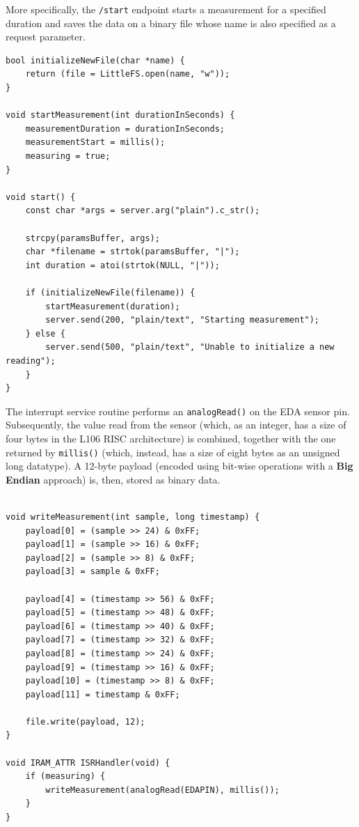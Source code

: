 More specifically, the \texttt{/start} endpoint starts a measurement for a specified duration and saves the data on a binary file whose name is also specified as a request parameter.

\begin{verbatim}
bool initializeNewFile(char *name) {
    return (file = LittleFS.open(name, "w"));
}

void startMeasurement(int durationInSeconds) {
    measurementDuration = durationInSeconds;
    measurementStart = millis();
    measuring = true;
}

void start() {
    const char *args = server.arg("plain").c_str();

    strcpy(paramsBuffer, args);
    char *filename = strtok(paramsBuffer, "|");
    int duration = atoi(strtok(NULL, "|"));

    if (initializeNewFile(filename)) {
        startMeasurement(duration);
        server.send(200, "plain/text", "Starting measurement");
    } else {
        server.send(500, "plain/text", "Unable to initialize a new reading");
    }
}
\end{verbatim}

The interrupt service routine performs an \texttt{analogRead()} on the EDA sensor pin. Subsequently, the value read from the sensor (which, as an integer, has a size of four bytes in the L106 RISC architecture) is combined, together with the one returned by \texttt{millis()} (which, instead, has a size of eight bytes as an unsigned long datatype). A 12-byte payload (encoded using bit-wise operations with a \textbf{Big Endian} approach) is, then, stored as binary data.


\pagebreak

\begin{verbatim}

void writeMeasurement(int sample, long timestamp) {
    payload[0] = (sample >> 24) & 0xFF;
    payload[1] = (sample >> 16) & 0xFF;
    payload[2] = (sample >> 8) & 0xFF;
    payload[3] = sample & 0xFF;  

    payload[4] = (timestamp >> 56) & 0xFF;
    payload[5] = (timestamp >> 48) & 0xFF;
    payload[6] = (timestamp >> 40) & 0xFF;
    payload[7] = (timestamp >> 32) & 0xFF;
    payload[8] = (timestamp >> 24) & 0xFF;
    payload[9] = (timestamp >> 16) & 0xFF;
    payload[10] = (timestamp >> 8) & 0xFF;
    payload[11] = timestamp & 0xFF;

    file.write(payload, 12);
}

void IRAM_ATTR ISRHandler(void) {
    if (measuring) {
        writeMeasurement(analogRead(EDAPIN), millis());
    }
}
\end{verbatim}

